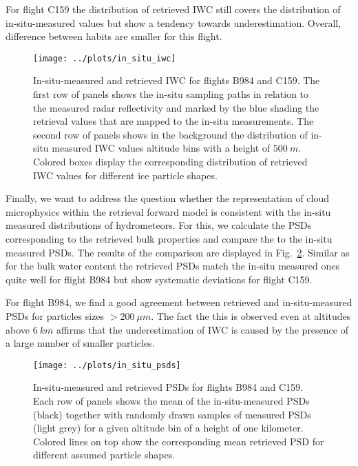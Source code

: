 \documentclass[journal abbreviation, manuscript]{copernicus}
\begin{document}
For flight C159 the distribution of retrieved IWC still covers the distribution
of in-situ-measured values but show a tendency towards underestimation. Overall,
difference between habits are smaller for this flight.

\begin{figure}[!hbpt]
  \centering
  \texttt{[image: ../plots/in\_situ\_iwc]}
  \caption{In-situ-measured and retrieved IWC for flights B984
    and C159. The first row of panels shows the in-situ sampling paths in
    relation to the measured radar reflectivity and marked by the
    blue shading the retrieval values that are mapped to the
    in-situ measurements. The second row of panels shows in the background
    the distribution of in-situ measured IWC values altitude bins with
    a height of $500\ \unit{m}$. Colored boxes display the corresponding
    distribution of retrieved IWC values for different ice particle shapes.}
  \label{fig:in_situ_iwc}
\end{figure}

Finally, we want to address the question whether the representation of cloud
microphysics within the retrieval forward model is consistent with the in-situ
measured distributions of hydrometeors. For this, we calculate the PSDs
corresponding to the retrieved bulk properties and compare the to the in-situ
measured PSDs. The results of the comparison are displayed in
Fig.~\ref{fig:in_situ_psds}. Similar as for the bulk water content the retrieved
PSDs match the in-situ measured ones quite well for flight B984 but show
systematic deviations for flight C159.

For flight B984, we find a good agreement between retrieved and in-situ-measured
PSDs for particles sizes $> 200 \ \unit{\mu m}$. The fact the this is observed
even at altitudes above $6 \ \unit{km}$ affirms that the underestimation of
IWC is caused by the presence of a large number of smaller particles.

\begin{figure}[!hbpt]
  \centering
  \texttt{[image: ../plots/in\_situ\_psds]}
  \caption{In-situ-measured and retrieved PSDs for flights B984
    and C159. Each row of panels shows the mean of the in-situ-measured
    PSDs (black) together with randomly drawn samples of measured PSDs
    (light grey) for a given altitude bin of a height of one kilometer.
    Colored lines on top show the corresponding mean retrieved PSD for
    different assumed particle shapes.}
  \label{fig:in_situ_psds}
\end{figure}
\end{document}
